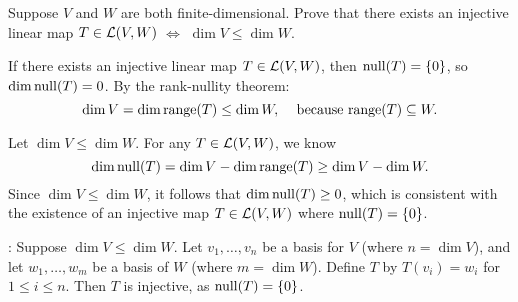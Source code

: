 \begin{xrcs}
  Suppose $V$ and $W$ are both finite-dimensional. Prove that there exists an injective linear map $T \in \mathcal{L}(V,W)$ $\iff$ $\dim V \leq \dim W$.

  \begin{prf}
    \Rightarrowdirection If there exists an injective linear map $T \in \mathcal{L}(V,W)$, then $\operatorname{null}(T) = \{0\}$, so $\dim \operatorname{null}(T) = 0$. By the rank-nullity theorem:
    \begin{equation}
      \dim V = \dim \myrange(T) \leq \dim W, \quad $ because $ \myrange(T) \subseteq W.
    \end{equation}

    \Leftarrowdirection Let $\dim V \leq \dim W$. For any $T \in \mathcal{L}(V,W)$, we know
    \begin{equation}
      \dim \operatorname{null}(T) = \dim V - \dim \operatorname{range}(T) \geq \dim V - \dim W.
    \end{equation}
    Since $\dim V \leq \dim W$, it follows that $\dim \operatorname{null}(T) \geq 0$, which is consistent with the existence of an injective map $T \in \mathcal{L}(V,W)$ where $\operatorname{null}(T) = \{0\}$.

    :
    Suppose $\dim V \leq \dim W$. Let $v_1, \dots, v_n$ be a basis for $V$ (where $n = \dim V$), and let $w_1, \dots, w_m$ be a basis of $W$ (where $m = \dim W$). Define $T$ by $T(v_i) = w_i$ for $1 \leq i \leq n$. Then $T$ is injective, as $\operatorname{null}(T) = \{0\}$.
  \end{prf}
\end{xrcs}


